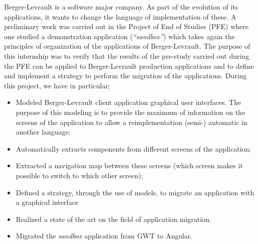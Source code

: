 Berger-Levrault is a software major company. As part of the evolution of
its applications, it wants to change the language of implementation of
these. A preliminary work was carried out in the Project of End of
Studies (PFE) where one studied a demonstration application
(\emph{``sandbox''}) which takes again the principles of organization of
the applications of Berger-Levrault. The purpose of this internship was
to verify that the results of the pre-study carried out during the PFE
can be applied to Berger-Levrault production applications and to define
and implement a strategy to perform the migration of the applications.
During this project, we have in particular;

\begin{itemize}
\tightlist
\item
  Modeled Berger-Levrault client application graphical user interfaces.
  The purpose of this modeling is to provide the maximum of information
  on the screens of the application to allow a reimplementation (semi-)
  automatic in another language;
\item
  Automatically extracts components from different screens of the
  application;
\item
  Extracted a navigation map between these screens (which screen makes
  it possible to switch to which other screen);
\item
  Defined a strategy, through the use of models, to migrate an
  application with a graphical interface
\item
  Realized a state of the art on the field of application migration.
\item
  Migrated the \emph{sandbox} application from GWT to Angular.
\end{itemize}
